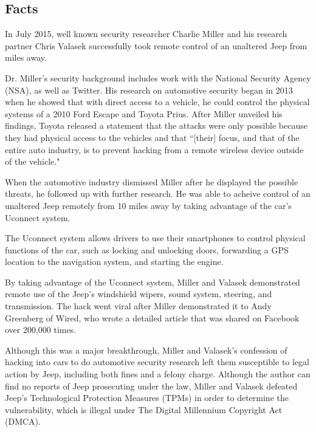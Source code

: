 \documentclass[12pt]{article}
\begin{document}
\tableofcontents
\newpage
\begin{multicols}{2}

\section{Facts}

In July 2015, well known security researcher Charlie Miller and his research partner Chris Valasek successfully took remote control of an unaltered Jeep from miles away. \cite{wired}

Dr. Miller's security background includes work with the National Security Agency (NSA), as well as Twitter. \cite{linkedin} His  research on automotive security began in 2013 when he showed that with direct access to a vehicle, he could control the physical systems of a 2010 Ford Escape and Toyota Prius. \cite{officialPaper} After Miller unveiled his findings, Toyota released a statement that the attacks were only possible because they had physical access to the vehicles and that ``[their] focus, and that of the entire auto industry, is to prevent hacking from a remote wireless device outside of the vehicle." \cite{originalHack}

When the automotive industry dismissed Miller after he displayed the possible threats, he followed up with further research. He was able to acheive control of an unaltered Jeep remotely from 10 miles away by taking advantage of the car's Uconnect system. \cite{officialPaper} 

The Uconnect system allows drivers to use their smartphones to control physical functions of the car, such as locking and unlocking doors, forwarding a GPS location to the navigation system, and starting the engine.\cite{uconnect} 

By taking advantage of the Uconnect system, Miller and Valasek demonstrated remote use of the Jeep's windshield wipers, sound system, steering, and transmission. \cite{wired} The hack went viral after Miller demonstrated it to Andy Greenberg of Wired, who wrote a detailed article that was shared on Facebook over 200,000 times.\cite{wired}

Although this was a major breakthrough, Miller and Valasek's confession of hacking into cars to do automotive security research left them susceptible to legal action by Jeep, including both fines and a felony charge. \cite{brokeDMCA} Although the author can find no reports of Jeep prosecuting under the law, Miller and Valasek defeated Jeep's Technological Protection Measures (TPMs) in order to determine the vulnerability, which is illegal under The Digital Millennium Copyright Act (DMCA).\cite{DMCA} 


\end{multicols}
\end{document}
